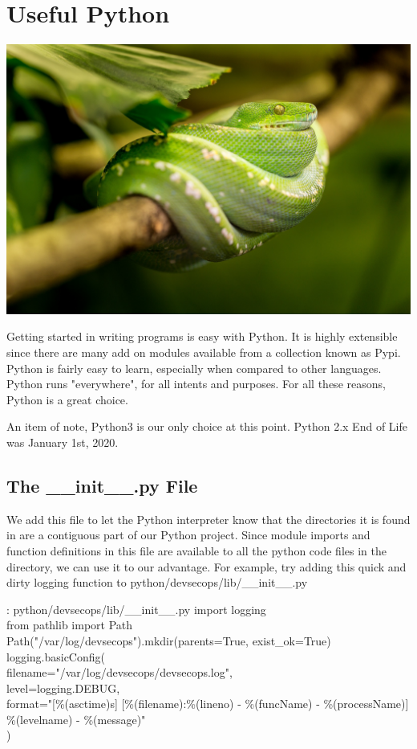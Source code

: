 \chapter{Useful Python}

\includegraphics[scale=0.85]{../images/snake-1634293_1920.jpg}

\justify
Getting started in writing programs is easy with Python. It is highly extensible since
there are many add on modules available from a collection known as Pypi. Python is fairly
easy to learn, especially when compared to other languages. Python runs "everywhere", for
all intents and purposes. For all these reasons, Python is a great choice.

\justify
An item of note, Python3 is our only choice at this point. Python 2.x End of Life was January 1st, 2020.

\section{The \_\_init\_\_.py File}

\justify
We add this file to let the Python interpreter know that the directories
it is found in are a contiguous part of our Python project. Since module
imports and function definitions in this file are available to all the
python code files in the directory, we can use it to our advantage. For
example, try adding this quick and dirty logging function to
python/devsecops/lib/\_\_init\_\_.py

\begin{mybox}{\thetcbcounter: python/devsecops/lib/\_\_init\_\_.py}
  import logging\\
  from pathlib import Path\\

  Path("/var/log/devsecops").mkdir(parents=True, exist\_ok=True)\\
  logging.basicConfig(\\
  filename="/var/log/devsecops/devsecops.log",\\
  level=logging.DEBUG,\\
  format="[\%(asctime)s] [\%(filename):\%(lineno) - \%(funcName) - \%(processName)] \%(levelname) - \%(message)"\\
  )
\end{mybox}

